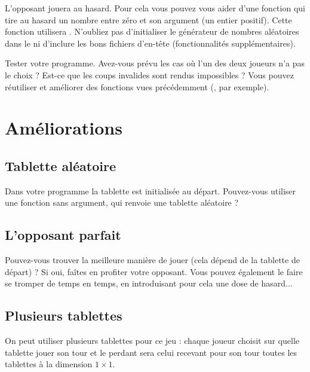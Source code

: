 L'opposant jouera au hasard. Pour cela vous pouvez vous aider d'une
fonction  qui tire au hasard un nombre entre
zéro et son argument (un entier positif). Cette fonction utilisera
. N'oubliez pas d'initialiser
le générateur de nombres aléatoires dans le  ni d'inclure
les bons fichiers d'en-tête (fonctionnalités supplémentaires).

Tester votre programme. Avez-vous prévu les cas où l'un des deux
joueurs n'a pas le choix ? Est-ce que les coups invalides sont rendus
impossibles ? Vous pouvez réutiliser et améliorer des fonctions vues
précédemment (, par exemple).

\section{Améliorations}

\subsection{Tablette aléatoire}
Dans votre programme la tablette est initialisée au
départ. Pouvez-vous utiliser une fonction sans argument,
 qui renvoie une tablette aléatoire ?

\subsection{L'opposant parfait}
Pouvez-vous trouver la meilleure manière de jouer (cela dépend de la
tablette de départ) ? Si oui, faîtes en profiter votre opposant. Vous
pouvez également le faire se tromper de temps en temps, en introduisant
pour cela une dose de hasard...

\subsection{Plusieurs tablettes}
On peut utiliser plusieurs tablettes pour ce jeu : chaque joueur
choisit sur quelle tablette jouer son tour et le perdant sera celui
recevant pour son tour toutes les tablettes à la dimension $1\times
1$.

\begin{correction}
{
\footnotesize
{}
}
\end{correction}



